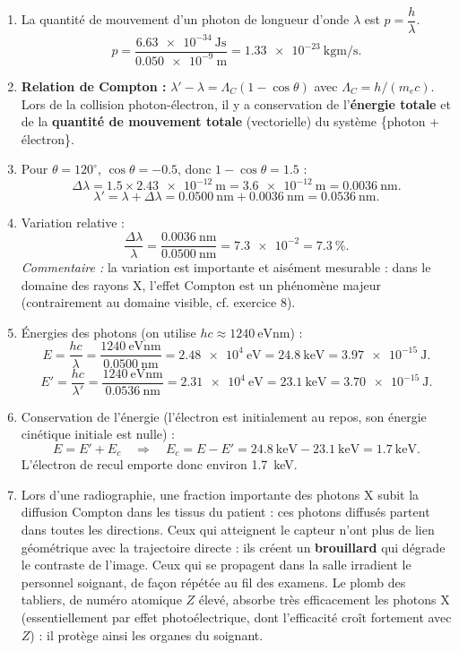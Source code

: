 \documentclass[11pt]{article}
\providecommand{\degree}{^{\circ}}
\begin{document}
\begin{corrige}
\begin{enumerate}
\item La quantité de mouvement d'un photon de longueur d'onde $\lambda$ est $p = \dfrac{h}{\lambda}$.
\[ p = \frac{\SI{6,63e-34}{\joule\second}}{\SI{0,050e-9}{\meter}} = \SI{1,33e-23}{\kilogram\meter\per\second}. \]
\item \textbf{Relation de Compton :} $\lambda' - \lambda = \Lambda_C(1-\cos\theta)$ avec $\Lambda_C = h/(m_e c)$. Lors de la collision photon-électron, il y a conservation de l'\textbf{énergie totale} et de la \textbf{quantité de mouvement totale} (vectorielle) du système \{photon + électron\}.
\item Pour $\theta = 120\degree$, $\cos\theta = -\num{0,5}$, donc $1 - \cos\theta = \num{1,5}$ :
\[ \Delta\lambda = \num{1,5}\times\SI{2,43e-12}{\meter} = \SI{3,6e-12}{\meter} = \SI{0,0036}{\nano\meter}. \]
\[ \lambda' = \lambda + \Delta\lambda = \SI{0,0500}{\nano\meter} + \SI{0,0036}{\nano\meter} = \SI{0,0536}{\nano\meter}. \]
\item Variation relative :
\[ \frac{\Delta\lambda}{\lambda} = \frac{\SI{0,0036}{\nano\meter}}{\SI{0,0500}{\nano\meter}} = \num{7,3e-2} = \SI{7,3}{\percent}. \]
\textit{Commentaire :} la variation est importante et aisément mesurable : dans le domaine des rayons X, l'effet Compton est un phénomène majeur (contrairement au domaine visible, cf. exercice 8).
\item Énergies des photons (on utilise $hc \approx \SI{1240}{\electronvolt\nano\meter}$) :
\[ E = \frac{hc}{\lambda} = \frac{\SI{1240}{\electronvolt\nano\meter}}{\SI{0,0500}{\nano\meter}} = \num{2,48e4}~\text{eV} = \SI{24,8}{\kilo\electronvolt} = \SI{3,97e-15}{\joule}. \]
\[ E' = \frac{hc}{\lambda'} = \frac{\SI{1240}{\electronvolt\nano\meter}}{\SI{0,0536}{\nano\meter}} = \num{2,31e4}~\text{eV} = \SI{23,1}{\kilo\electronvolt} = \SI{3,70e-15}{\joule}. \]
\item Conservation de l'énergie (l'électron est initialement au repos, son énergie cinétique initiale est nulle) :
\[ E = E' + E_c \quad\Rightarrow\quad E_c = E - E' = \SI{24,8}{\kilo\electronvolt} - \SI{23,1}{\kilo\electronvolt} = \SI{1,7}{\kilo\electronvolt}. \]
L'électron de recul emporte donc environ \SI{1,7}{\kilo\electronvolt}.
\item Lors d'une radiographie, une fraction importante des photons X subit la diffusion Compton dans les tissus du patient : ces photons diffusés partent dans toutes les directions. Ceux qui atteignent le capteur n'ont plus de lien géométrique avec la trajectoire directe : ils créent un \textbf{brouillard} qui dégrade le contraste de l'image. Ceux qui se propagent dans la salle irradient le personnel soignant, de façon répétée au fil des examens. Le plomb des tabliers, de numéro atomique $Z$ élevé, absorbe très efficacement les photons X (essentiellement par effet photoélectrique, dont l'efficacité croît fortement avec $Z$) : il protège ainsi les organes du soignant.
\end{enumerate}
\end{corrige}
\end{document}
